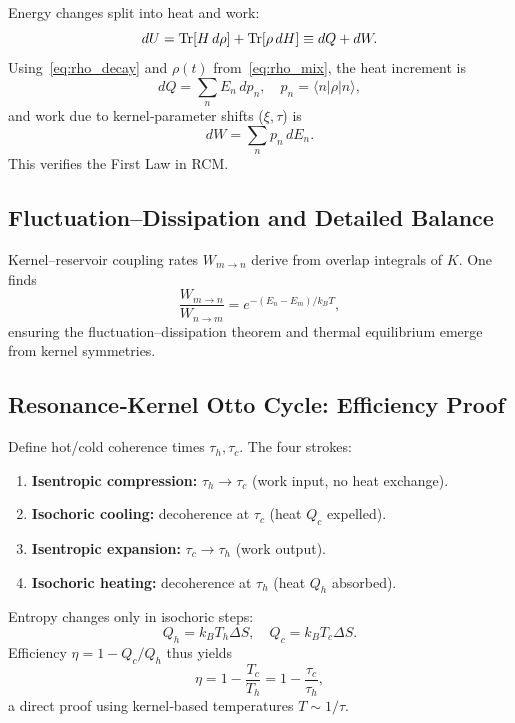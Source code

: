 Energy changes split into heat and work:
\[
dU = \Tr[H\,d\rho] + \Tr[\rho\,dH] \equiv dQ + dW.
\]
Using~\eqref{eq:rho_decay} and $\rho(t)$ from~\eqref{eq:rho_mix}, the heat increment is
\begin{equation}\label{eq:heat_def}
dQ = \sum_n E_n\,d p_n,\quad
p_n = \langle n|\rho|n\rangle,
\end{equation}
and work due to kernel‐parameter shifts ($\xi,\tau$) is
\begin{equation}\label{eq:work_def}
dW = \sum_n p_n\,dE_n.
\end{equation}
This verifies the First Law in RCM.

\subsection{Fluctuation–Dissipation and Detailed Balance}

Kernel–reservoir coupling rates $W_{m\to n}$ derive from overlap integrals of $K$.  One finds
\begin{equation}\label{eq:detailed_balance}
\frac{W_{m\to n}}{W_{n\to m}}
= e^{-(E_n-E_m)/k_B T},
\end{equation}
ensuring the fluctuation–dissipation theorem and thermal equilibrium emerge from kernel symmetries.

\subsection{Resonance‐Kernel Otto Cycle: Efficiency Proof}

Define hot/cold coherence times $\tau_h,\tau_c$.  The four strokes:

\begin{enumerate}
  \item \textbf{Isentropic compression:} $\tau_h\to\tau_c$ (work input, no heat exchange).
  \item \textbf{Isochoric cooling:} decoherence at $\tau_c$ (heat $Q_c$ expelled).
  \item \textbf{Isentropic expansion:} $\tau_c\to\tau_h$ (work output).
  \item \textbf{Isochoric heating:} decoherence at $\tau_h$ (heat $Q_h$ absorbed).
\end{enumerate}

Entropy changes only in isochoric steps:
\[
Q_h = k_B T_h\Delta S,\quad
Q_c = k_B T_c\Delta S.
\]
Efficiency $\eta = 1 - Q_c/Q_h$ thus yields
\begin{equation}\label{eq:otto_eff}
\eta = 1 - \frac{T_c}{T_h}
= 1 - \frac{\tau_c}{\tau_h},
\end{equation}
a direct proof using kernel‐based temperatures $T\sim1/\tau$.

